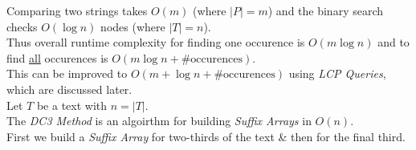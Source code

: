 \documentclass[11pt,a4paper]{article}
\begin{document}
Comparing two strings takes $O(m)$ (where $|P|=m$) and the binary search checks $O(\log n)$ nodes (where $|T|=n$).\\
Thus overall runtime complexity for finding one occurence is $O(m\log n)$ and to find \underline{all} occurences is $O(m\log n+\#\text{occurences})$.\\
\nb This can be improved to $O(m+\log n+\#\text{occurences})$ using \textit{LCP Queries}, which are discussed later.\\

Let $T$ be a text with $n=|T|$.\\
The \textit{DC3 Method} is an algoirthm for building \textit{Suffix Arrays} in $O(n)$.\\
First we build a \textit{Suffix Array} for two-thirds of the text \& then for the final third.
\end{document}

